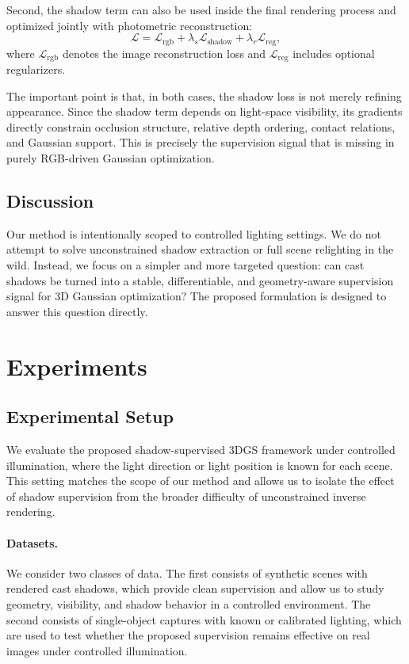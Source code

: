 Second, the shadow term can also be used inside the final rendering process and optimized jointly with photometric reconstruction:
\begin{equation}
\mathcal{L} = \mathcal{L}_{\text{rgb}} + \lambda_s \mathcal{L}_{\text{shadow}} + \lambda_r \mathcal{L}_{\text{reg}},
\end{equation}
where $\mathcal{L}_{\text{rgb}}$ denotes the image reconstruction loss and $\mathcal{L}_{\text{reg}}$ includes optional regularizers.

The important point is that, in both cases, the shadow loss is not merely refining appearance. Since the shadow term depends on light-space visibility, its gradients directly constrain occlusion structure, relative depth ordering, contact relations, and Gaussian support. This is precisely the supervision signal that is missing in purely RGB-driven Gaussian optimization.

\subsection{Discussion}

Our method is intentionally scoped to controlled lighting settings. We do not attempt to solve unconstrained shadow extraction or full scene relighting in the wild. Instead, we focus on a simpler and more targeted question: can cast shadows be turned into a stable, differentiable, and geometry-aware supervision signal for 3D Gaussian optimization? The proposed formulation is designed to answer this question directly.

\section{Experiments}
\label{sec:experiments}

\subsection{Experimental Setup}

We evaluate the proposed shadow-supervised 3DGS framework under controlled illumination, where the light direction or light position is known for each scene. This setting matches the scope of our method and allows us to isolate the effect of shadow supervision from the broader difficulty of unconstrained inverse rendering.

\paragraph{Datasets.}
We consider two classes of data. The first consists of synthetic scenes with rendered cast shadows, which provide clean supervision and allow us to study geometry, visibility, and shadow behavior in a controlled environment. The second consists of single-object captures with known or calibrated lighting, which are used to test whether the proposed supervision remains effective on real images under controlled illumination.


